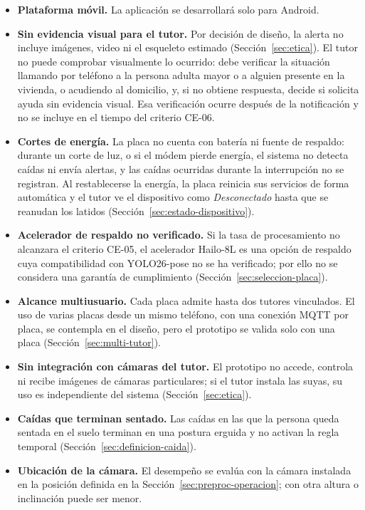 \documentclass[12pt,a4paper,oneside]{book}
\theoremstyle{plain}
\theoremstyle{definition}
\theoremstyle{remark}
\begin{document}
\begin{itemize}
  \item \textbf{Plataforma móvil.} La aplicación se desarrollará solo para Android.
  \item \textbf{Sin evidencia visual para el tutor.} Por decisión de diseño, la alerta no incluye imágenes, video ni el esqueleto estimado (Sección~\ref{sec:etica}). El tutor no puede comprobar visualmente lo ocurrido: debe verificar la situación llamando por teléfono a la persona adulta mayor o a alguien presente en la vivienda, o acudiendo al domicilio, y, si no obtiene respuesta, decide si solicita ayuda sin evidencia visual. Esa verificación ocurre después de la notificación y no se incluye en el tiempo del criterio CE-06.
  \item \textbf{Cortes de energía.} La placa no cuenta con batería ni fuente de respaldo: durante un corte de luz, o si el módem pierde energía, el sistema no detecta caídas ni envía alertas, y las caídas ocurridas durante la interrupción no se registran. Al restablecerse la energía, la placa reinicia sus servicios de forma automática y el tutor ve el dispositivo como \textit{Desconectado} hasta que se reanudan los latidos (Sección~\ref{sec:estado-dispositivo}).
  \item \textbf{Acelerador de respaldo no verificado.} Si la tasa de procesamiento no alcanzara el criterio CE-05, el acelerador Hailo-8L es una opción de respaldo cuya compatibilidad con YOLO26-pose no se ha verificado; por ello no se considera una garantía de cumplimiento (Sección~\ref{sec:seleccion-placa}).
  \item \textbf{Alcance multiusuario.} Cada placa admite hasta dos tutores vinculados. El uso de varias placas desde un mismo teléfono, con una conexión MQTT por placa, se contempla en el diseño, pero el prototipo se valida solo con una placa (Sección~\ref{sec:multi-tutor}).
  \item \textbf{Sin integración con cámaras del tutor.} El prototipo no accede, controla ni recibe imágenes de cámaras particulares; si el tutor instala las suyas, su uso es independiente del sistema (Sección~\ref{sec:etica}).
  \item \textbf{Caídas que terminan sentado.} Las caídas en las que la persona queda sentada en el suelo terminan en una postura erguida y no activan la regla temporal (Sección~\ref{sec:definicion-caida}).
  \item \textbf{Ubicación de la cámara.} El desempeño se evalúa con la cámara instalada en la posición definida en la Sección~\ref{sec:preproc-operacion}; con otra altura o inclinación puede ser menor.

\end{itemize}
\end{document}
